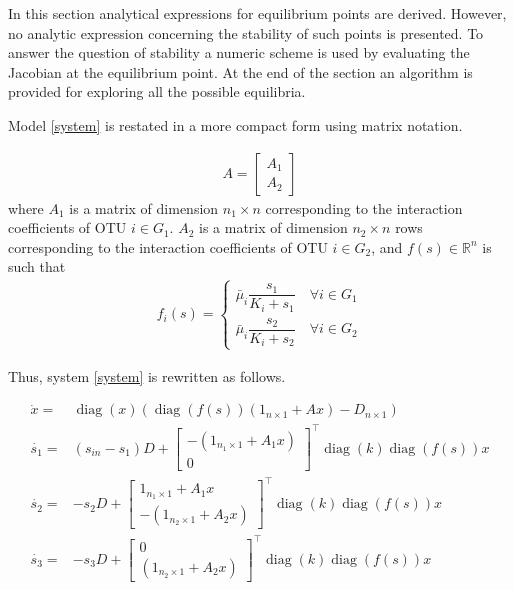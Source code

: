 \documentclass[3p,times]{article}
\newcommand{\R}{\mathbb{R}}
\DeclareMathOperator{\diag}{diag}
\begin{document}
In this section analytical expressions for equilibrium points are derived. However, no analytic expression concerning the stability of such points is presented. To answer the question of stability a numeric scheme is used by evaluating the Jacobian at the equilibrium point. At the end of the section an algorithm is provided for exploring all the possible equilibria.

Model \eqref{system} is restated in a more compact form using matrix notation.

\begin{align} A = \begin{bmatrix}
A_1\\A_2
\end{bmatrix}\end{align}
where $A_1$ is a matrix of dimension $n_1 \times n$ corresponding to the interaction coefficients of OTU $i \in G_1$. $A_2$ is a matrix of dimension $n_2 \times n$ rows corresponding to the interaction coefficients of OTU $i \in G_2$, and  $f(s) \in \R^n$ is such that 
\begin{align}
f_i(s) = \begin{cases}
\bar{\mu}_i \dfrac{s_1}{K_i + s_1} \quad \forall i \in G_1 \\
\bar{\mu}_i \dfrac{s_2}{K_i + s_2} \quad \forall i \in G_2
\end{cases}
\end{align}

Thus, system \eqref{system} is rewritten as follows. 

\begin{align}
\label{Eq1}	\dot{x} = & \diag(x)(\diag(f(s))(1_{n\times 1} + Ax) - D_{n\times 1}) \\
\label{Eq2}	\dot{s_1} = & (s_{in}-s_1)D + \begin{bmatrix}
-(1_{n_1\times 1} +A_1x) \\0
\end{bmatrix}^\top \diag(k) \diag(f(s))x \\
\label{Eq3}	\dot{s_2} = & -s_2D+
\begin{bmatrix}
1_{n_1\times 1} +A_1x \\ -(1_{n_2\times 1} +A_2x)
\end{bmatrix}^\top \diag(k) \diag(f(s))x \\	
\label{Eq4}	\dot{s_3} = & -s_3D+\begin{bmatrix}
0	\\(1_{n_2\times 1} +A_2x) 
\end{bmatrix}^\top \diag(k) \diag(f(s))x 
\end{align} 
\end{document}
